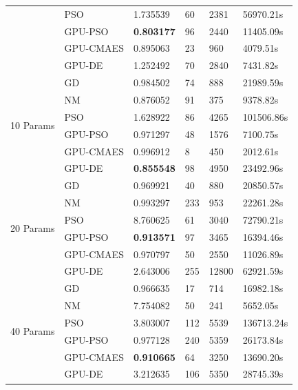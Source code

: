 \begin{table}[h!]
\begin{tabular}{llllll}
  & PSO          & 1.735539 & 60 & 2381 & 56970.21s \\
  & GPU-PSO      & \textbf{0.803177} & 96 & 2440 & 11405.09s \\
  & GPU-CMAES    & 0.895063 & 23 & 960 & 4079.51s \\
  & GPU-DE       & 1.252492 & 70 & 2840 & 7431.82s \\
\midrule
 \multirow{6}{*}{10 Params} & GD           & 0.984502 & 74 & 888 & 21989.59s \\
  & NM           & 0.876052 & 91 & 375 & 9378.82s \\
  & PSO          & 1.628922 & 86 & 4265 & 101506.86s \\
  & GPU-PSO      & 0.971297 & 48 & 1576 & 7100.75s \\
  & GPU-CMAES    & 0.996912 & 8 & 450 & 2012.61s \\
  & GPU-DE       & \textbf{0.855548} & 98 & 4950 & 23492.96s \\
\midrule
 \multirow{6}{*}{20 Params} & GD           & 0.969921 & 40 & 880 & 20850.57s \\
  & NM           & 0.993297 & 233 & 953 & 22261.28s \\
  & PSO          & 8.760625 & 61 & 3040 & 72790.21s \\
  & GPU-PSO      & \textbf{0.913571} & 97 & 3465 & 16394.46s \\
  & GPU-CMAES    & 0.970797 & 50 & 2550 & 11026.89s \\
  & GPU-DE       & 2.643006 & 255 & 12800 & 62921.59s \\
\midrule
 \multirow{6}{*}{40 Params} & GD           & 0.966635 & 17 & 714 & 16982.18s \\
  & NM           & 7.754082 & 50 & 241 & 5652.05s \\
  & PSO          & 3.803007 & 112 & 5539 & 136713.24s \\
  & GPU-PSO      & 0.977128 & 240 & 5359 & 26173.84s \\
  & GPU-CMAES    & \textbf{0.910665} & 64 & 3250 & 13690.20s \\
  & GPU-DE       & 3.212635 & 106 & 5350 & 28745.39s \\
\bottomrule
\end{tabular}
\end{table}
